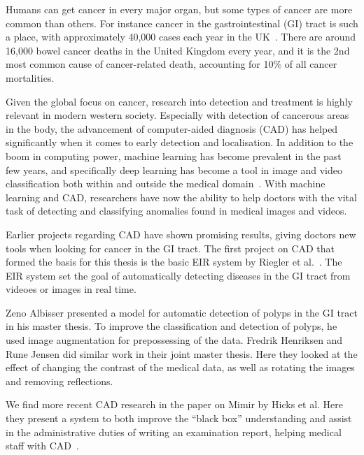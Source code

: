 Humans can get cancer in every major organ, but some types of cancer are more common than others.    
For instance cancer in the gastrointestinal (GI) tract is such a place, with approximately 40,000 cases each year in the UK~\cite{UKCancerBowel}. There are around 16,000 bowel cancer deaths in the United Kingdom every year, and it is the 2nd most common cause of cancer-related death, accounting for 10\% of all cancer mortalities.


Given the global focus on cancer, research into detection and treatment is highly relevant in modern western society. 
Especially with detection of cancerous areas in the body, the advancement of computer-aided diagnosis (CAD) has helped significantly when it comes to early detection and localisation. In addition to the boom in computing power, machine learning has become prevalent in the past few years, and specifically deep learning has become a tool in image and video classification both within and outside the medical domain~\cite{NIPS2012_4824,DBLP:journals/corr/SimonyanZ14a,DBLP:journals/corr/SimonyanZ14a,DBLP:journals/corr/HeZRS15,DBLP:journals/corr/SzegedyIV16}. 
With machine learning and CAD, researchers have now the ability to help doctors with the vital task of detecting and classifying anomalies found in medical images and videos.

Earlier projects regarding CAD have shown promising results, giving doctors new tools when looking for cancer in the GI tract.
The first project on CAD that formed the basis for this thesis is the basic EIR system by Riegler et al.~\cite{riegler2016eir}.  The EIR system set the goal of automatically detecting diseases in the GI tract from videoes or images in real time.

Zeno Albisser presented a model for automatic detection of polyps in the GI tract in his master thesis. To improve the classification and detection of polyps, he used image augmentation for prepossessing of the data. 
Fredrik Henriksen and Rune Jensen did similar work in their joint master thesis. Here they looked at the effect of changing the contrast of the medical data, as well as rotating the images and removing reflections.

We find more recent CAD research in the paper on Mimir by Hicks et al. Here they present a system to both improve the ``black box'' understanding and assist in the administrative duties of writing an examination report, helping medical staff with CAD~\cite{25953}. 

